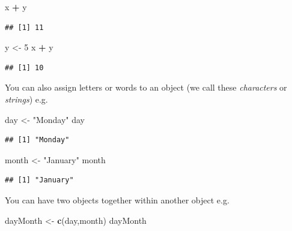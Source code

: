 \documentclass[
]{article}
\newenvironment{Shaded}{\begin{snugshade}}{\end{snugshade}}
\newcommand{\DecValTok}[1]{\textcolor[rgb]{0.00,0.00,0.81}{#1}}
\newcommand{\KeywordTok}[1]{\textcolor[rgb]{0.13,0.29,0.53}{\textbf{#1}}}
\newcommand{\NormalTok}[1]{#1}
\newcommand{\OperatorTok}[1]{\textcolor[rgb]{0.81,0.36,0.00}{\textbf{#1}}}
\newcommand{\StringTok}[1]{\textcolor[rgb]{0.31,0.60,0.02}{#1}}
\begin{document}
\begin{Shaded}
\begin{Highlighting}[]
\NormalTok{x }\OperatorTok{+}\StringTok{ }\NormalTok{y}
\end{Highlighting}
\end{Shaded}

\begin{verbatim}
## [1] 11
\end{verbatim}

\begin{Shaded}
\begin{Highlighting}[]
\NormalTok{y <-}\StringTok{ }\DecValTok{5}
\NormalTok{x }\OperatorTok{+}\StringTok{ }\NormalTok{y}
\end{Highlighting}
\end{Shaded}

\begin{verbatim}
## [1] 10
\end{verbatim}

You can also assign letters or words to an object (we call these
\emph{characters} or \emph{strings}) e.g.

\begin{Shaded}
\begin{Highlighting}[]
\NormalTok{day <-}\StringTok{ "Monday"}
\NormalTok{day}
\end{Highlighting}
\end{Shaded}

\begin{verbatim}
## [1] "Monday"
\end{verbatim}

\begin{Shaded}
\begin{Highlighting}[]
\NormalTok{month <-}\StringTok{ "January"}
\NormalTok{month}
\end{Highlighting}
\end{Shaded}

\begin{verbatim}
## [1] "January"
\end{verbatim}

You can have two objects together within another object e.g.

\begin{Shaded}
\begin{Highlighting}[]
\NormalTok{dayMonth <-}\StringTok{ }\KeywordTok{c}\NormalTok{(day,month)}
\NormalTok{dayMonth}
\end{Highlighting}
\end{Shaded}
\end{document}
